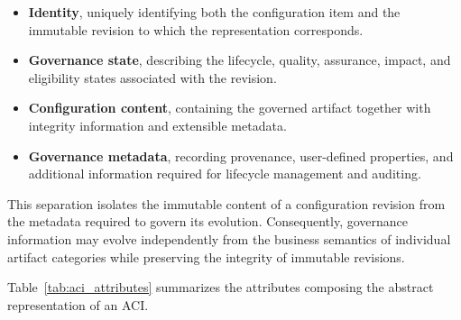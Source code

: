 \documentclass[10pt]{article}
\begin{document}
\begin{itemize}

\item \textbf{Identity}, uniquely identifying both the configuration item and the immutable revision to which the representation corresponds.

\item \textbf{Governance state}, describing the lifecycle, quality, assurance,
impact, and eligibility states associated with the revision.

\item \textbf{Configuration content}, containing the governed artifact together with integrity information and extensible metadata.

\item \textbf{Governance metadata}, recording provenance, user-defined properties, and additional information required for lifecycle management and auditing.

\end{itemize}

This separation isolates the immutable content of a configuration revision from the metadata required to govern its evolution. Consequently, governance information may evolve independently from the business semantics of individual artifact categories while preserving the integrity of immutable revisions.

Table~\ref{tab:aci_attributes} summarizes the attributes composing the abstract representation of an ACI.
\end{document}
